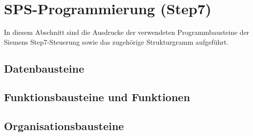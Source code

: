 








\clearpage



\section{SPS-Programmierung (Step7)}
\label{chap:anhang_programm}

In diesem Abschnitt sind die Ausdrucke der verwendeten Programmbausteine der Siemens Step7-Steuerung sowie das zugehörige Strukturgramm aufgeführt.

\subsection{Datenbausteine}





\subsection{Funktionsbausteine und Funktionen}





\subsection{Organisationsbausteine}
